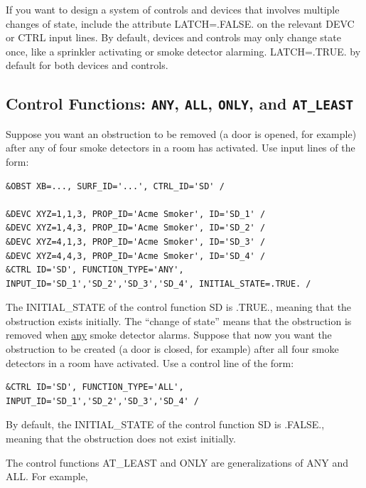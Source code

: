 \documentclass[11pt]{book}
\begin{document}
If you want to design a system of controls and devices that involves multiple changes of state, include the attribute {\ct LATCH=.FALSE.} on the
relevant {\ct DEVC} or {\ct CTRL} input lines. By default, devices and controls may only change state once, like a sprinkler activating or
smoke detector alarming. {\ct LATCH=.TRUE.} by default for both devices and controls.


\subsection{Control Functions: \texorpdfstring{{\tt ANY}}{ANY}, \texorpdfstring{{\tt ALL}}{ALL}, \texorpdfstring{{\tt ONLY}}{ONLY}, and
\texorpdfstring{{\tt AT\_LEAST}}{AT_LEAST} }

Suppose you want an obstruction to be removed (a door is opened, for example) after any of four smoke detectors in a room has activated. Use input lines of the
form:

\footnotesize
\begin{verbatim}
&OBST XB=..., SURF_ID='...', CTRL_ID='SD' /

&DEVC XYZ=1,1,3, PROP_ID='Acme Smoker', ID='SD_1' /
&DEVC XYZ=1,4,3, PROP_ID='Acme Smoker', ID='SD_2' /
&DEVC XYZ=4,1,3, PROP_ID='Acme Smoker', ID='SD_3' /
&DEVC XYZ=4,4,3, PROP_ID='Acme Smoker', ID='SD_4' /
&CTRL ID='SD', FUNCTION_TYPE='ANY', INPUT_ID='SD_1','SD_2','SD_3','SD_4', INITIAL_STATE=.TRUE. /
\end{verbatim}
\normalsize

\noindent
The {\ct INITIAL\_STATE} of the control function {\ct SD} is {\ct .TRUE.}, meaning that the obstruction exists
initially. The ``change of state'' means that the obstruction is removed when \underline{any} smoke detector alarms.
Suppose that now you want the obstruction to be created (a door is closed, for example) after all four smoke detectors in a room have activated. Use a control line
of the form:

\footnotesize
\begin{verbatim}
&CTRL ID='SD', FUNCTION_TYPE='ALL', INPUT_ID='SD_1','SD_2','SD_3','SD_4' /
\end{verbatim}
\normalsize

\noindent
By default, the {\ct INITIAL\_STATE} of the control function {\ct SD} is {\ct .FALSE.}, meaning that the obstruction does not exist
initially.

The control functions {\ct AT\_LEAST} and {\ct ONLY} are generalizations of {\ct ANY} and {\ct ALL}. For example,
\end{document}
